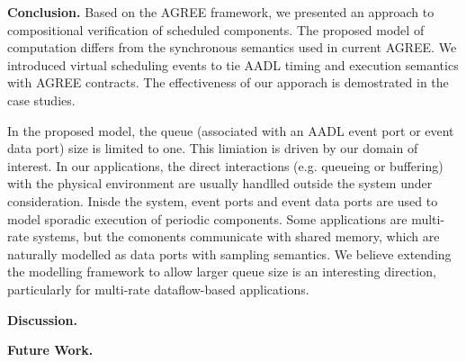 {\bf Conclusion.}
Based on the AGREE framework, we presented an approach to compositional verification of scheduled components. The proposed model of computation differs from the synchronous semantics used in current AGREE. We introduced virtual scheduling events to tie AADL timing and execution semantics with AGREE contracts. The effectiveness of our apporach is demostrated in the case studies.

In the proposed model, the queue (associated with an AADL event port or event data port) size is limited to one. This limiation is driven by our domain of interest. In our applications, the direct interactions (e.g. queueing or buffering) with the physical environment are usually handlled outside the system under consideration. Inisde the system, event ports and event data ports are used to model sporadic execution of periodic components. Some applications are multi-rate systems, but the comonents communicate with shared memory, which are naturally modelled as data ports with sampling semantics. We believe extending the modelling framework to allow larger queue size is an interesting direction, particularly for multi-rate dataflow-based applications. 

{\bf Discussion.}

{\bf Future Work.}

